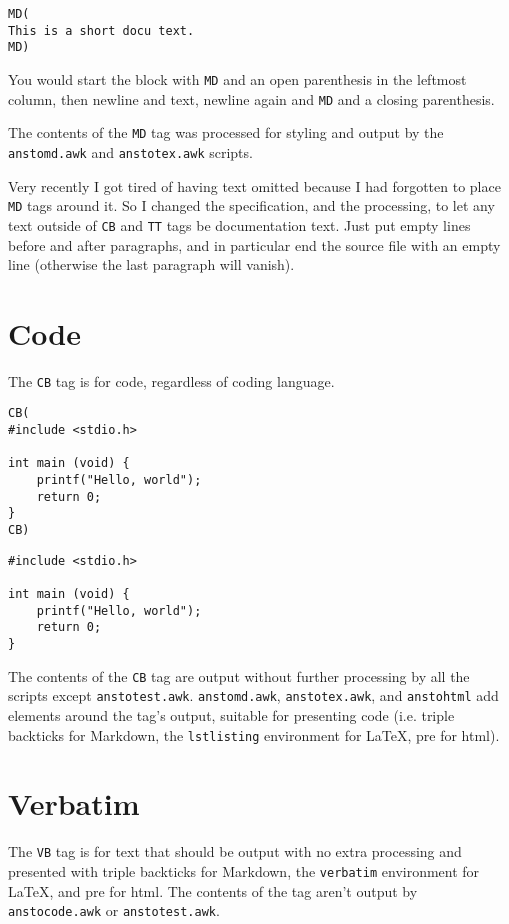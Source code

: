 \begin{verbatim}
MD(
This is a short docu text.
MD)
\end{verbatim}

You would start the block with \texttt{MD} and an open parenthesis in the leftmost column, then newline and text, newline again and \texttt{MD} and a closing parenthesis.


The contents of the \texttt{MD} tag was processed for styling and output by the \texttt{anstomd.awk} and \texttt{anstotex.awk} scripts.


Very recently I got tired of having text omitted because I had forgotten to place \texttt{MD} tags around it. So I changed the specification, and the processing, to let any text outside of \texttt{CB} and \texttt{TT} tags be documentation text. Just put empty lines before and after paragraphs, and in particular end the source file with an empty line (otherwise the last paragraph will vanish).

\section{Code}
\label{code}

The \texttt{CB} tag is for code, regardless of coding language.

\begin{verbatim}
CB(
#include <stdio.h>

int main (void) {
    printf("Hello, world");
    return 0;
}
CB)
\end{verbatim}
\begin{lstlisting}
#include <stdio.h>

int main (void) {
    printf("Hello, world");
    return 0;
}
\end{lstlisting}

The contents of the \texttt{CB} tag are output without further processing by all the scripts except \texttt{anstotest.awk}. \texttt{anstomd.awk}, \texttt{anstotex.awk}, and \texttt{anstohtml} add elements around the tag's output, suitable for presenting code (i.e. triple backticks for Markdown, the \texttt{lstlisting} environment for \LaTeX{}, pre for html).

\section{Verbatim}
\label{verbatim}

The \texttt{VB} tag is for text that should be output with no extra processing and presented with triple backticks for Markdown, the \texttt{verbatim} environment for \LaTeX{}, and pre for html. The contents of the tag aren't output by \texttt{anstocode.awk} or \texttt{anstotest.awk}.

